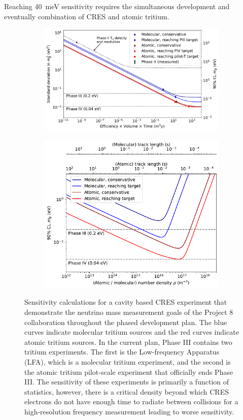 Reaching 40~meV sensitivity requires the simultaneous development and eventually combination of CRES and atomic tritium.
\begin{figure}[htbp]
    \centering
    \begin{subfigure}{0.725\textwidth}
        \includegraphics*[width=\textwidth]{figs/Chapter-3/sensitivity_vs_exposure_curve.pdf}
    \end{subfigure}
    \begin{subfigure}{0.67\textwidth}
        \includegraphics*[width=\textwidth]{figs/Chapter-3/sensitivity_vs_density_curve.pdf}
    \end{subfigure}
    \caption{Sensitivity calculations for a cavity based CRES experiment that demonstrate the neutrino mass measurement goals of the Project 8 collaboration throughout the phased development plan. The blue curves indicate molecular tritium sources and the red curves indicate atomic tritium sources. In the current plan, Phase III contains two tritium experiments. The first is the Low-frequency Apparatus (LFA), which is a molecular tritium experiment, and the second is the atomic tritium pilot-scale experiment that officially ends Phase III. The sensitivity of these experiments is primarily a function of statistics, however, there is a critical density beyond which CRES electrons do not have enough time to radiate between collisions for a high-resolution frequency measurement leading to worse sensitivity. }
\end{figure}
